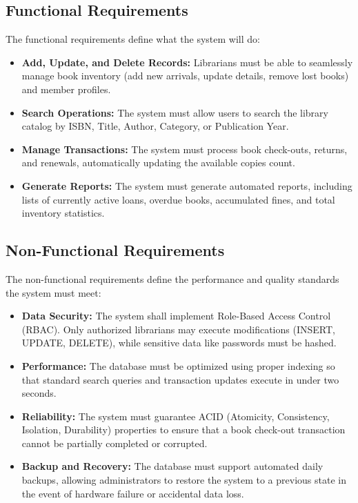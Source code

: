 \documentclass{thesis-library}
\begin{document}
\subsection{Functional Requirements}
The functional requirements define what the system will do:
\begin{itemize}
    \item \textbf{Add, Update, and Delete Records:} Librarians must be able to seamlessly manage book inventory (add new arrivals, update details, remove lost books) and member profiles.
    \item \textbf{Search Operations:} The system must allow users to search the library catalog by ISBN, Title, Author, Category, or Publication Year.
    \item \textbf{Manage Transactions:} The system must process book check-outs, returns, and renewals, automatically updating the available copies count.
    \item \textbf{Generate Reports:} The system must generate automated reports, including lists of currently active loans, overdue books, accumulated fines, and total inventory statistics.
\end{itemize}

\subsection{Non-Functional Requirements}
The non-functional requirements define the performance and quality standards the system must meet:
\begin{itemize}
    \item \textbf{Data Security:} The system shall implement Role-Based Access Control (RBAC). Only authorized librarians may execute modifications (INSERT, UPDATE, DELETE), while sensitive data like passwords must be hashed.
    \item \textbf{Performance:} The database must be optimized using proper indexing so that standard search queries and transaction updates execute in under two seconds.
    \item \textbf{Reliability:} The system must guarantee ACID (Atomicity, Consistency, Isolation, Durability) properties to ensure that a book check-out transaction cannot be partially completed or corrupted.
    \item \textbf{Backup and Recovery:} The database must support automated daily backups, allowing administrators to restore the system to a previous state in the event of hardware failure or accidental data loss.
\end{itemize}
\end{document}
